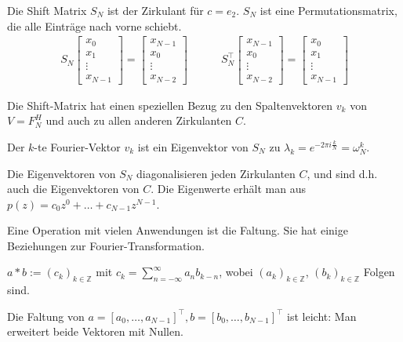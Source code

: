 Die Shift Matrix $S_N$ ist der Zirkulant für $c=e_2$. $S_N$ ist eine Permutationsmatrix, die alle Einträge nach vorne schiebt.
\begin{align*}
    S_N \begin{bmatrix}
        x_0 \\
        x_1 \\
        \vdots \\
        x_{N-1}
    \end{bmatrix}
    =
    \begin{bmatrix}
        x_{N-1} \\
        x_0 \\
        \vdots \\
        x_{N-2}
    \end{bmatrix}
    \quad \quad \quad 
    S_N^\top \begin{bmatrix}
        x_{N-1} \\
        x_0 \\
        \vdots \\
        x_{N-2}
    \end{bmatrix}
    =
    \begin{bmatrix}
        x_0 \\
        x_1 \\
        \vdots \\
        x_{N-1}
    \end{bmatrix}
\end{align*}

Die Shift-Matrix hat einen speziellen Bezug zu den Spaltenvektoren $v_k$ von $V = F_N^H$ und auch zu allen anderen Zirkulanten $C$.

\inlineremark Der $k$-te Fourier-Vektor $v_k$ ist ein Eigenvektor von $S_N$ zu $\lambda_k = e^{-2\pi i \frac{k}{N}}=\omega_N^k$.

 Die Eigenvektoren von $S_N$ diagonalisieren jeden Zirkulanten $C$, und sind d.h. auch die Eigenvektoren von $C$.
Die Eigenwerte erhält man aus $p(z) = c_0z^0 + \ldots + c_{N-1}z^{N-1}$.

Eine Operation mit vielen Anwendungen ist die Faltung. Sie hat einige Beziehungen zur Fourier-Transformation.

 $a * b := (c_k)_{k \in \mathbb{Z}}$ mit $c_k=\displaystyle\sum_{n=-\infty}^{\infty}a_nb_{k-n}$, wobei $(a_k)_{k \in \mathbb{Z}}$, $(b_k)_{k \in \mathbb{Z}}$ Folgen sind.

Die Faltung von $a = [a_0,\ldots,a_{N-1}]^\top, b = [b_0,\ldots,b_{N-1}]^\top$ ist leicht: Man erweitert beide Vektoren mit Nullen.

